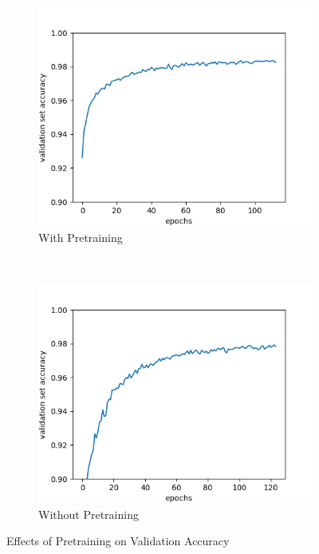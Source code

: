 \documentclass{article}
\begin{document}
	\begin{figure}[h!]
		\centering
		\begin{subfigure}[b]{0.4\textwidth}
			\includegraphics[width=\textwidth]{images/pretrain.png}
			\caption{With Pretraining}
			\label{fig:pretrain}
		\end{subfigure}
		~
		\begin{subfigure}[b]{0.4\textwidth}
			\includegraphics[width=\textwidth]{images/no_pretrain.png}
			\caption{Without Pretraining}
			\label{fig:no_pretrain}
		\end{subfigure}
		\caption{Effects of Pretraining on Validation Accuracy}
		\label{fig:pretrain_comp}
	\end{figure}
\end{document}
